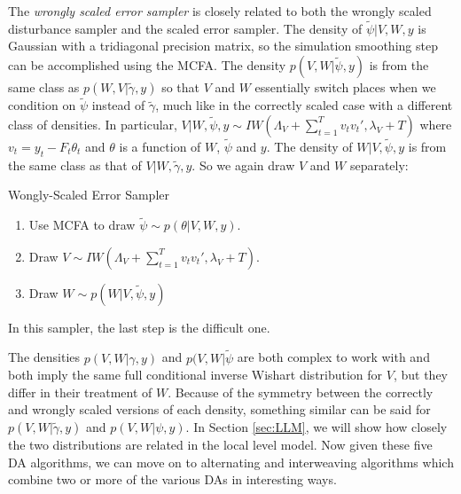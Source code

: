 \documentclass{article}
\begin{document}
The {\it wrongly scaled error sampler} is closely related to both the wrongly scaled disturbance sampler and the scaled error sampler. The density of $\tilde{\psi}|V,W,y$ is Gaussian with a tridiagonal precision matrix, so the simulation smoothing step can be accomplished using the MCFA. The density $p(V,W|\tilde{\psi},y)$ is from the same class as $p(W,V|\tilde{\gamma},y)$ so that $V$ and $W$ essentially switch places when we condition on $\tilde{\psi}$ instead of $\tilde{\gamma}$, much like in the correctly scaled case with a different class of densities. In particular, $V|W,\tilde{\psi},y \sim IW\left(\Lambda_V + \sum_{t=1}^Tv_tv_t',\lambda_V + T\right)$ where $v_t = y_t - F_t\theta_t$ and $\theta$ is a function of $W$, $\tilde{\psi}$ and $y$. The density of $W|V,\tilde{\psi},y$ is from the same class as that of $V|W,\tilde{\gamma},y$. So we again draw $V$ and $W$ separately:
\begin{alg*}[WSE]Wongly-Scaled Error Sampler\label{alg:DLMwerror}
\begin{enumerate}
\item Use MCFA to draw $\tilde{\psi} \sim p(\theta|V,W,y)$.
\item Draw $V \sim IW\left(\Lambda_V + \sum_{t=1}^Tv_tv_t',\lambda_V + T\right)$.
\item Draw $W \sim p(W|V,\tilde{\psi},y)$
\end{enumerate}
\end{alg*}\noindent
In this sampler, the last step is the difficult one.

The densities $p(V,W|\gamma,y)$ and $p(V,W|\tilde{\psi}$ are both complex to work with and both imply the same full conditional inverse Wishart distribution for $V$, but they differ in their treatment of $W$. Because of the symmetry between the correctly and wrongly scaled versions of each density, something similar can be said for $p(V,W|\tilde{\gamma},y)$ and $p(V,W|\psi,y)$. In Section \ref{sec:LLM}, we will show how closely the two distributions are related in the local level model. Now given these five DA algorithms, we can move on to alternating and interweaving algorithms which combine two or more of the various DAs in interesting ways.
\end{document}
